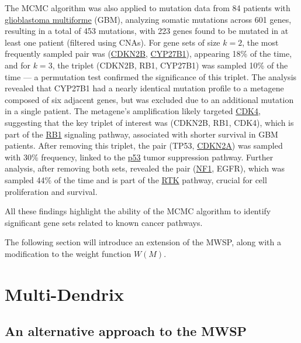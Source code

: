 The MCMC algorithm was also applied to mutation data from 84 patients with \href{https://en.wikipedia.org/wiki/Glioblastoma}{glioblastoma multiforme} (GBM), analyzing somatic mutations across 601 genes, resulting in a total of 453 mutations, with 223 genes found to be mutated in at least one patient (filtered using CNAs). For gene sets of size $k = 2$, the most frequently sampled pair was (\href{https://en.wikipedia.org/wiki/CDKN2B}{CDKN2B}, \href{https://en.wikipedia.org/wiki/25-Hydroxyvitamin_D_1-alpha-hydroxylase}{CYP27B1}), appearing 18\% of the time, and for $k = 3$, the triplet (CDKN2B, RB1, CYP27B1) was sampled 10\% of the time --- a permutation test confirmed the significance of this triplet. The analysis revealed that CYP27B1 had a nearly identical mutation profile to a metagene composed of six adjacent genes, but was excluded due to an additional mutation in a single patient. The metagene's amplification likely targeted \href{https://en.wikipedia.org/wiki/Cyclin-dependent_kinase_4}{CDK4}, suggesting that the key triplet of interest was (CDKN2B, RB1, CDK4), which is part of the \href{https://en.wikipedia.org/wiki/Retinoblastoma_protein}{RB1} signaling pathway, associated with shorter survival in GBM patients. After removing this triplet, the pair (TP53, \href{https://en.wikipedia.org/wiki/CDKN2A}{CDKN2A}) was sampled with 30\% frequency, linked to the \href{https://en.wikipedia.org/wiki/P53}{p53} tumor suppression pathway. Further analysis, after removing both sets, revealed the pair (\href{https://en.wikipedia.org/wiki/Neurofibromatosis_type_I}{NF1}, EGFR), which was sampled 44\% of the time and is part of the \href{https://en.wikipedia.org/wiki/Receptor_tyrosine_kinase}{RTK} pathway, crucial for cell proliferation and survival.

All these findings highlight the ability of the MCMC algorithm to identify significant gene sets related to known cancer pathways.

The following section will introduce an extension of the MWSP, along with a modification to the weight function $W(M)$.

\section{Multi-Dendrix}

\subsection{An alternative approach to the MWSP} \label{multi-dendrix_chap3_first_sect}

